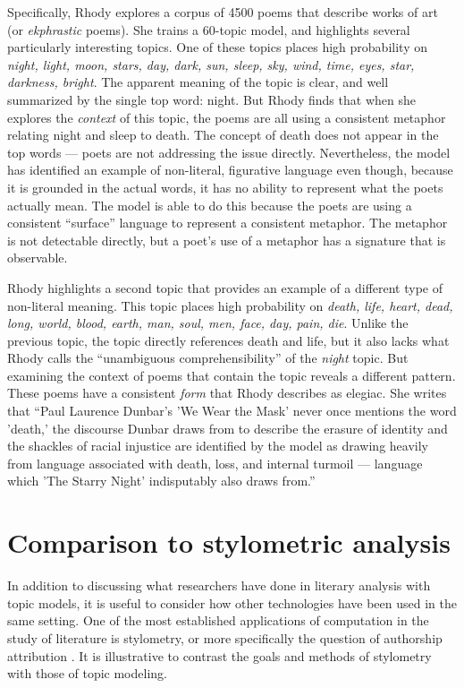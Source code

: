 Specifically, Rhody explores a corpus of 4500 poems that describe works of art (or {\em ekphrastic} poems).
She trains a 60-topic model, and highlights several particularly interesting topics.
One of these topics places high probability on {\em night, light, moon, stars, day, dark, sun, sleep, sky, wind, time, eyes, star, darkness, bright}.
The apparent meaning of the topic is clear, and well summarized by the single top word: night.
But Rhody finds that when she explores the {\em context} of this topic, the poems are all using a consistent metaphor relating night and sleep to death.
The concept of death does not appear in the top words --- poets are not addressing the issue directly.
Nevertheless, the model has identified an example of non-literal, figurative language even though, because it is grounded in the actual words, it has no ability to represent what the poets actually mean.
The model is able to do this because the poets are using a consistent ``surface'' language to represent a consistent metaphor.
The metaphor is not detectable directly, but a poet's use of a metaphor has a signature that is observable.

Rhody highlights a second topic that provides an example of a different type of non-literal meaning.
This topic places high probability on {\em death, life, heart, dead, long, world, blood, earth, man, soul, men, face, day, pain, die}.
Unlike the previous topic, the topic directly references death and life, but it also lacks what Rhody calls the ``unambiguous comprehensibility'' of the {\em night} topic.
But examining the context of poems that contain the topic reveals a different pattern.
These poems have a consistent {\em form} that Rhody describes as elegiac.
She writes that ``Paul Laurence Dunbar's 'We Wear the Mask' never once mentions the word 'death,' the discourse Dunbar draws from to describe the erasure of identity and the shackles of racial injustice are identified by the model as drawing heavily from language associated with death, loss, and internal turmoil --- language which 'The Starry Night' indisputably also draws from.''

\section{Comparison to stylometric analysis}

In addition to discussing what researchers have done in literary analysis with topic models, it is useful to consider how other technologies have been used in the same setting.
One of the most established applications of computation in the study of literature is stylometry, or more specifically the question of authorship attribution \cite{juola2008authorship}.
It is illustrative to contrast the goals and methods of stylometry with those of topic modeling.


